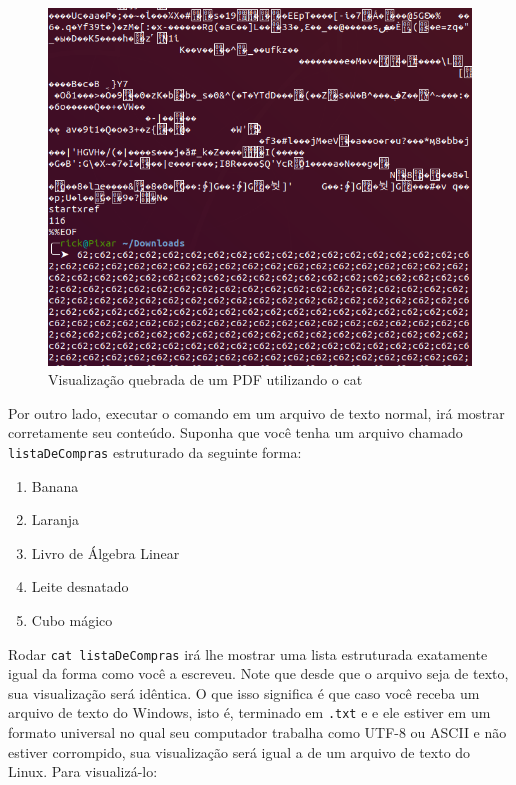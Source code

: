 \documentclass{article}
\begin{document}
	\begin{figure}[ht!]
  		\centering
		\includegraphics[scale=0.3]{figs/brokenCat.png} 
  		\caption*{Visualização quebrada de um PDF utilizando o cat}
	\end{figure}


	Por outro lado, executar o comando em um arquivo de texto normal, irá mostrar corretamente seu conteúdo. 
	Suponha que você tenha um arquivo chamado \texttt{listaDeCompras} estruturado da seguinte forma:

	\begin{enumerate}
		\item{Banana}
		\item{Laranja} 
		\item{Livro de Álgebra Linear} 
		\item{Leite desnatado} 
		\item{Cubo mágico} 
	\end{enumerate} 

	Rodar \texttt{cat listaDeCompras} irá lhe mostrar uma lista estruturada exatamente igual da forma como você a escreveu. 
	Note que desde que o arquivo seja de texto, sua visualização será idêntica. O que isso significa é que caso você receba um 
	arquivo de texto do Windows, isto é, terminado em \texttt{.txt} e e ele estiver em um formato universal no qual 
	seu computador trabalha como UTF-8 ou ASCII e não estiver corrompido, sua visualização será igual a de um arquivo 
	de texto do Linux. Para visualizá-lo: 
\end{document}
